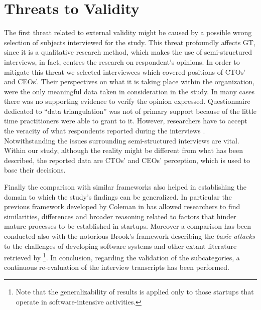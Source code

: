 \documentclass[10pt,journal,letterpaper,compsoc]{IEEEtran}
\begin{document}
\section{Threats to Validity}
\label{valt}

The first threat related to external validity might be caused by a possible wrong selection of subjects interviewed for the study. This threat profoundly affects GT, since it is a qualitative research method, which makes the use of semi-structured interviews, in fact, centres the research on respondent's opinions. In order to mitigate this threat we selected interviewees which covered positions of CTOs' and CEOs'. Their perspectives on what it is taking place within the organization, were the only meaningful data taken in consideration in the study.  In many cases there was no supporting evidence to verify the opinion expressed. Questionnaire dedicated to ``data triangulation'' was not of primary support because of the little time practitioners were able to grant to it. However, researchers have to accept the veracity of what respondents reported during the interviews \cite{Coleman2008a}. Notwithstanding the issues surrounding semi-structured interviews are vital. Within our study, although the reality might 
be different from what has been described, the reported data are CTOs' and CEOs' perception, which is used to base their decisions.

Finally the comparison with similar frameworks also helped in establishing the domain to which the study's findings can be generalized. In particular the previous framework developed by Coleman in \cite{Coleman2008} has allowed researchers to find similarities, differences and broader reasoning related to factors that hinder mature processes to be established in startups. Moreover a comparison has been conducted also with the notorious Brook's framework describing the \textit{basic attacks} to the challenges of developing software systems and other extant literature retrieved by \cite{SMS}\footnote{Note that the generalizability of results is applied only to those startups that operate in software-intensive activities.}. In conclusion, regarding the validation of the subcategories, a continuous re-evaluation of the interview transcripts has been performed.
\end{document}
